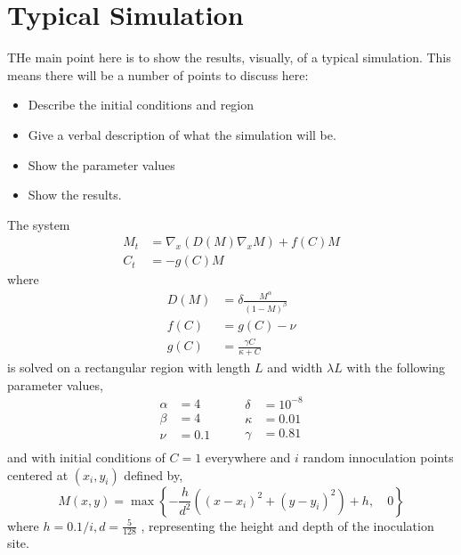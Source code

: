 \section{Typical Simulation}

THe main point here is to show the results, visually, of a typical simulation.
This means there will be a number of points to discuss here:
\begin{itemize}
  \item Describe the initial conditions and region
  \item Give a verbal description of what the simulation will be.
  \item Show the parameter values
  \item Show the results.
\end{itemize}


The system
\begin{align}
    M_t &= \nabla_x \left( D(M) \nabla_x M \right) + f(C) M \\
    C_t &= - g(C) M 
\end{align}
where
\begin{align}
    D(M) &= \delta \frac{M^\alpha}{(1 - M)^\beta} \\
    f(C) &= g(C) - \nu  \\
    g(C) &= \frac{\gamma C}{\kappa +C}
\end{align}
is solved on a rectangular region with length $L$ and width $\lambda L$ with the following parameter values,
\begin{equation}
\begin{aligned}
    \alpha &= 4 \\
    \beta &= 4 \\
    \nu &= 0.1 \\      
\end{aligned}
\qquad
\begin{aligned}
    \delta &= 10^{-8} \\
    \kappa &= 0.01 \\
    \gamma &= 0.81 \\
\end{aligned}
\end{equation}
and with initial conditions of $C = 1$ everywhere and $i$ random innoculation points centered at $(x_i, y_i)$ defined by, 
\begin{equation}
  M(x,y) = \max \left\{ -\frac{h}{d^2} \left((x-x_i)^2 + (y-y_i)^2\right) + h, \quad 0 \right\}
\end{equation}  
where $h = 0.1/i, d=\frac{5}{128}$ , representing the height and depth of the inoculation site.

